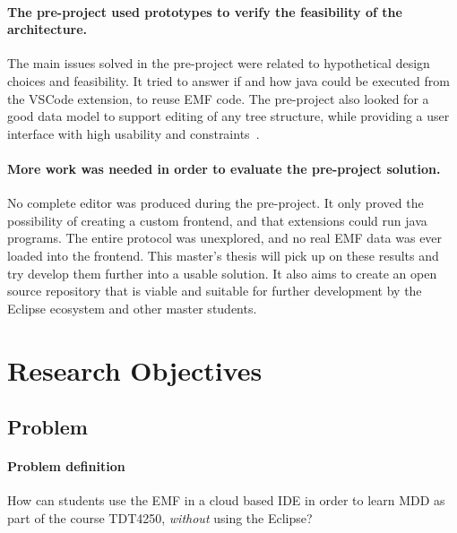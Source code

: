 \paragraph{The pre-project used prototypes to verify the feasibility of the architecture.}
The main issues solved in the pre-project were related to hypothetical design choices and feasibility.
It tried to answer if and how java could be executed from the \gls{VSCode} extension, to reuse \acrshort{EMF} code.
The pre-project also looked for a good data model to support editing of any tree structure, while providing a user interface with high usability and constraints~\cite[p.~24,25]{rekstadModelingEnvironmentCloud2020}.

\paragraph{More work was needed in order to evaluate the pre-project solution.}
No complete editor was produced during the pre-project.
It only proved the possibility of creating a custom frontend, and that extensions could run java programs.
The entire protocol was unexplored, and no real \acrshort{EMF} data was ever loaded into the frontend.
This master's thesis will pick up on these results and try develop them further into a usable solution.
It also aims to create an \gls{open source} repository that is viable and suitable for further development by the Eclipse ecosystem and other master students.

\section{Research Objectives}\label{sec:research-objectives}

\subsection{Problem}

\paragraph{Problem definition}
How can students use the \acrfull{EMF} in a \gls{cloud} based \acrfull{IDE} in order to learn \acrfull{MDD} as part of the course \gls{TDT4250}, \textit{without} using the \gls{Eclipse}?

